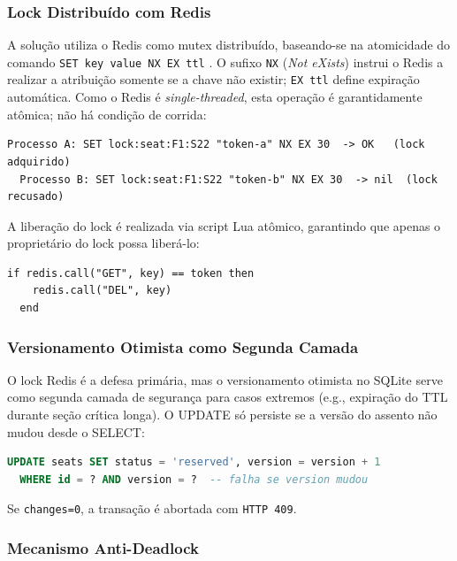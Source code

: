 \documentclass[12pt]{article}
\begin{document}
\subsubsection{Lock Distribuído com Redis}

A solução utiliza o Redis como mutex distribuído, baseando-se na atomicidade do comando
\texttt{SET key value NX EX ttl} \cite{antirez2016}. O sufixo \texttt{NX}
(\textit{Not eXists}) instrui o Redis a realizar a atribuição somente se a chave não
existir; \texttt{EX ttl} define expiração automática. Como o Redis é
\textit{single-threaded}, esta operação é garantidamente atômica; não há condição de
corrida:

\begin{lstlisting}[language={}]
  Processo A: SET lock:seat:F1:S22 "token-a" NX EX 30  -> OK   (lock adquirido)
  Processo B: SET lock:seat:F1:S22 "token-b" NX EX 30  -> nil  (lock recusado)
\end{lstlisting}

A liberação do lock é realizada via script Lua atômico, garantindo que apenas o
proprietário do lock possa liberá-lo:

\begin{lstlisting}[language={}]
  if redis.call("GET", key) == token then
    redis.call("DEL", key)
  end
\end{lstlisting}

\subsubsection{Versionamento Otimista como Segunda Camada}

O lock Redis é a defesa primária, mas o versionamento otimista no SQLite serve como
segunda camada de segurança para casos extremos (e.g., expiração do TTL durante seção
crítica longa). O UPDATE só persiste se a versão do assento não mudou desde o SELECT:

\begin{lstlisting}[language=SQL]
  UPDATE seats SET status = 'reserved', version = version + 1
  WHERE id = ? AND version = ?  -- falha se version mudou
\end{lstlisting}

Se \texttt{changes=0}, a transação é abortada com \texttt{HTTP 409}.

\subsubsection{Mecanismo Anti-Deadlock}
\end{document}

